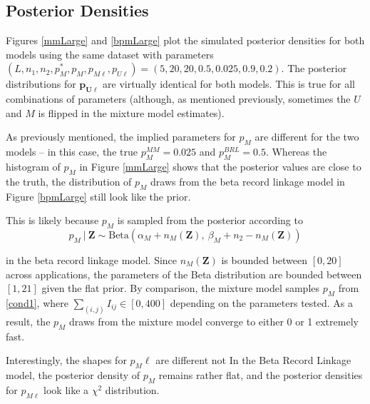 \documentclass[11pt,reqno]{amsart}
\begin{document}
\subsection{Posterior Densities}

Figures \ref{mmLarge} and \ref{bpmLarge} plot the simulated posterior densities for both models using the same dataset with parameters $(L, n_1, n_2, p_M^*, p_M, p_{M\ell}, p_{U\ell}) = (5, 20, 20, 0.5,0.025,0.9,0.2)$.   The posterior distributions for $\mathbf{p_{U\ell}}$ are virtually identical for both models.  This is true for all combinations of parameters (although, as mentioned previously, sometimes the $U$ and $M$ is flipped in the mixture model estimates).  

As previously mentioned, the implied parameters for $p_M$ are different for the two models -- in this case, the true $p_M^{MM} = 0.025$ and $p_M^{BRL} = 0.5$.  Whereas the histogram of $p_M$ in Figure \ref{mmLarge} shows that the posterior values are close to the truth, the distribution of $p_M$ draws from the beta record linkage model in Figure \ref{bpmLarge} still look like the prior.  

This is likely because $p_M$ is sampled from the posterior according to 
\begin{equation} p_M\ |\ \mathbf{Z} \sim \text{Beta}(\alpha_M + n_{M}(\mathbf{Z}),\ \beta_M + n_{2} - n_{M}(\mathbf{Z})) \end{equation}

in the beta record linkage model.  Since $n_M(\textbf{Z})$ is bounded between $[0,20]$ across applications, the parameters of the Beta distribution are bounded between $[1,21]$ given the flat prior.  By comparison, the mixture model samples $p_M$ from \ref{cond1}, where $\sum_{(i,j)}I_{ij} \in [0,400]$ depending on the parameters tested.  As a result, the $p_M$ draws from the mixture model converge to either 0 or 1 extremely fast. 


Interestingly, the shapes for $p_M{\ell}$ are different not In the Beta Record Linkage model, the posterior density of $p_M$ remains rather flat, and the posterior densities for $p_{M\ell}$  look like a $\chi^2$ distribution. 
\end{document}

